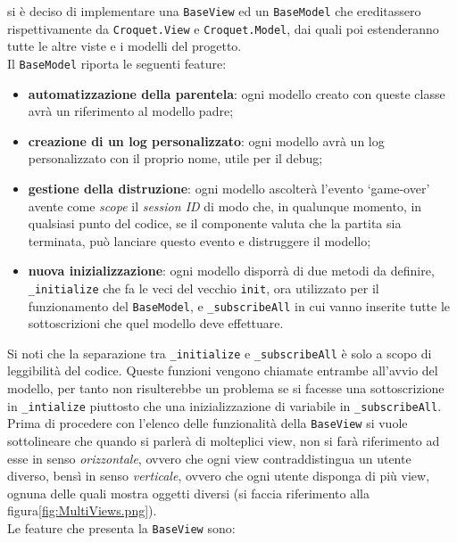 si è deciso di implementare una \texttt{BaseView} ed un \texttt{BaseModel} che ereditassero rispettivamente da \texttt{Croquet.View} e \texttt{Croquet.Model}, dai quali poi estenderanno
tutte le altre viste e i modelli del progetto.\\
Il \texttt{BaseModel} riporta le seguenti feature:
\begin{itemize}
    \item \textbf{automatizzazione della parentela}: ogni modello creato con queste classe avrà un riferimento al modello padre;
    \item \textbf{creazione di un log personalizzato}: ogni modello avrà un log personalizzato con il proprio nome, utile per il debug;
    \item \textbf{gestione della distruzione}: ogni modello ascolterà l'evento `game-over' avente come \textit{scope} il \textit{session ID} di modo che, in qualunque momento, in qualsiasi
    punto del codice, se il componente valuta che la partita sia terminata, può lanciare questo evento e distruggere il modello;
    \item \textbf{nuova inizializzazione}: ogni modello disporrà di due metodi da definire, \texttt{\_initialize} che fa le veci del vecchio \texttt{init}, ora utilizzato per il funzionamento
    del \texttt{BaseModel}, e \texttt{\_subscribeAll} in cui vanno inserite tutte le sottoscrizioni che quel modello deve effettuare.
\end{itemize}
Si noti che la separazione tra \texttt{\_initialize} e \texttt{\_subscribeAll} è solo a scopo di leggibilità del codice. Queste funzioni vengono chiamate entrambe all'avvio del modello, per
tanto non risulterebbe un problema se si facesse una sottoscrizione in \texttt{\_intialize} piuttosto che una inizializzazione di variabile in \texttt{\_subscribeAll}.\\
Prima di procedere con l'elenco delle funzionalità della \texttt{BaseView} si vuole sottolineare che quando si parlerà di molteplici view, non si farà riferimento ad esse in senso
\textit{orizzontale}, ovvero che ogni view contraddistingua un utente diverso, bensì in senso \textit{verticale}, ovvero che ogni utente disponga di più view, ognuna delle quali mostra
oggetti diversi (si faccia riferimento alla figura\ref{fig:MultiViews.png}).\\
Le feature che presenta la \texttt{BaseView} sono:
